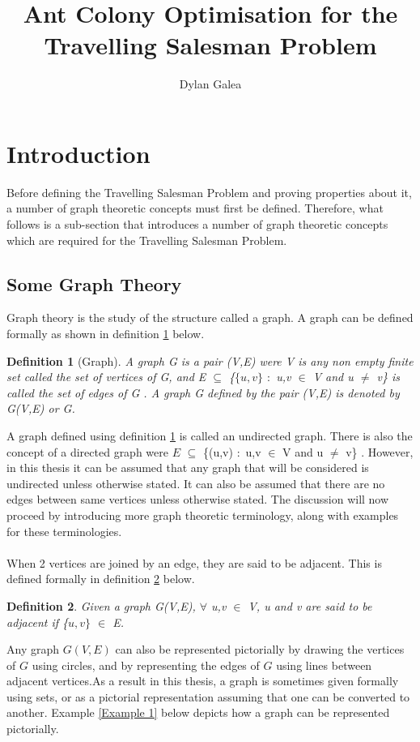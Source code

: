 \documentclass{article}
\title{Ant Colony Optimisation for the Travelling Salesman Problem}
\author{Dylan Galea}
\newtheorem{definition}{Definition}[subsection]
\begin{document}
\maketitle
\newpage
\tableofcontents
\newpage
\section{Introduction}
Before defining the Travelling Salesman Problem and proving properties about it, a number of graph theoretic concepts must first be defined. Therefore, what follows is a sub-section that introduces a number of graph theoretic concepts which are required for the Travelling Salesman Problem.
\subsection{Some Graph Theory}
Graph theory is the study of the structure called a graph. A graph can be defined formally as shown in definition \ref{Graph} below.
\begin{definition}[Graph]
\label{Graph}
A graph G is a pair (V,E) were V is any non empty finite set called the set of vertices of G, and E $\subseteq$ \{$\{u,v\}$ $:$ u,v $\in$ V and u $\neq$ v\} is called the set of edges of G {}. A graph G defined by the pair (V,E) is denoted by G(V,E) or G.
\end{definition}
A graph defined using definition \ref{Graph} is called an undirected graph. There is also the concept of a directed graph were $\mathit{E}$ $\subseteq$ \{(u,v) $:$ u,v $\in$ V and u $\neq$ v\} \cite{black_tanenbaum_2017}. However, in this thesis it can be assumed that any graph that will be considered is undirected unless otherwise stated. It can also be assumed that there are no edges between same vertices unless otherwise stated. The discussion will now proceed by introducing more graph theoretic terminology, along with examples for these terminologies.\\
\\When 2 vertices are joined by an edge, they are said to be adjacent. This is defined formally in definition \ref{adjacent} below.
\begin{definition}
\label{adjacent}
Given a graph G(V,E), $\forall$ u,v $\in$ V, u and v are said to be adjacent if \{$u,v\}$ $\in$ E. 
\end{definition}
Any graph $\mathit{G(V,E)}$ can also be represented pictorially by drawing the vertices of $\mathit{G}$ using circles, and by representing the edges of $\mathit{G}$ using lines between adjacent vertices.As a result in this thesis, a graph is sometimes given formally using sets, or as a pictorial representation assuming that one can be converted to another. Example \ref{Example 1} below depicts how a graph can be represented pictorially.
\end{document}
